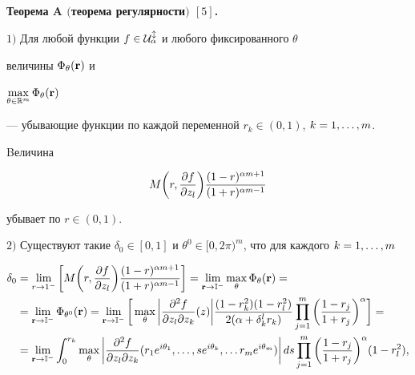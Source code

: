 {\bf Теорема A $($теорема регулярности$)$ $[5]$.}


{\it


$1)$ Для любой функции $f\in\cal U^l_\alpha$ и любого фиксированного $\theta$


величины $\Phi_\theta(\bold r)$ и


$\max\limits_{\theta\in\Bbb R^m}


\Phi_\theta (\bold r)$


--- убывающие функции по каждой переменной $r_k\in (0,1)$, $k= 1,\dotsc,m$.


Bеличина


$$


M\bigg(r,\pol\bigg)\frac{(1-r)^{\alpha m+1}}{(1+r)^{\alpha m-1}}


$$


убывает по $r\in (0,1)$.





$2)$ Существуют такие $\delta_0\in [0,1]$ и $\theta^0\in


[0,2\pi)^m$, что для каждого $k=1,\cd,m$


\begin{align*}


\delta_0&=\lim_{r\to


1^-}\bigg[M\bigg(r,\pol\bigg)\frac{(1-r)^{\alpha m+1}}{(1+r)^{\alpha


m-1}}\bigg]=\lim_{\bold r\to\Bbb I^-}\max_\theta \Phi_\theta(\bold r)=\\


%


&=\lim_{\bold r\to\Bbb I^-}\Phi_{\theta^0}(\bold r)=


\lim_{\bold r\to\Bbb


I^-}\bigg[\max_\theta \bigg|\frac{\partial^2f} {\partial z_l\partial


z_k}(z)\bigg|\frac{(1-r_k^2)(1-r_l^2)}{2(\alpha +


\delta_k^lr_k)}\prod_{j=1}^m\bigg(\frac{1-r_j}{1+r_j}\bigg)^\alpha\bigg]=\\


%


&=\lim_{\bold r\to\Bbb I^-}\int_0^{r_k}\max_\theta


\bigg|\frac{\partial ^2f} {\partial z_l\partial


z_k}(r_1e^{i\theta_1},\cd,se^{i\theta_k},\cd r_me^{i\theta_m})\bigg|\,


ds\prod_{j=1}^m\bigg(\frac{1-r_j}{1+r_j}\bigg)^\alpha (1-r_l^2),



\end{align*}}
